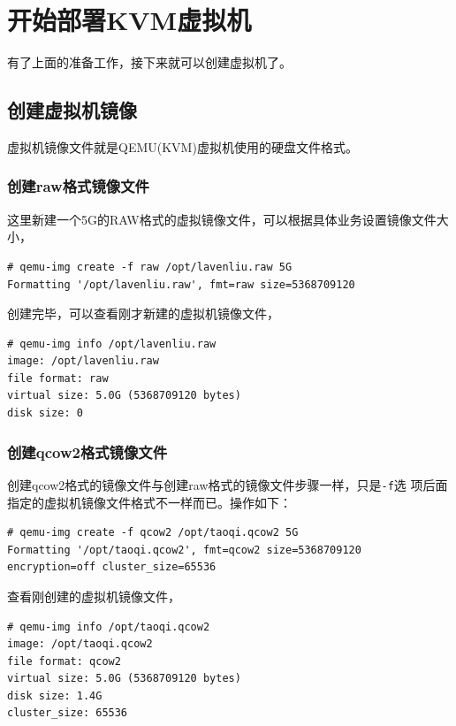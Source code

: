 \section{开始部署KVM虚拟机}
\label{sec:beginKVM}

有了上面的准备工作，接下来就可以创建虚拟机了。

\subsection{创建虚拟机镜像}
\label{sec:createVmImg}

虚拟机镜像文件就是QEMU(KVM)虚拟机使用的硬盘文件格式。

\subsubsection{创建raw格式镜像文件}
\label{sec:createRawImg}

这里新建一个5G的RAW格式的虚拟镜像文件，可以根据具体业务设置镜像文件大小，

\begin{verbatim}
# qemu-img create -f raw /opt/lavenliu.raw 5G
Formatting '/opt/lavenliu.raw', fmt=raw size=5368709120
\end{verbatim}

创建完毕，可以查看刚才新建的虚拟机镜像文件，

\begin{verbatim}
# qemu-img info /opt/lavenliu.raw 
image: /opt/lavenliu.raw
file format: raw
virtual size: 5.0G (5368709120 bytes)
disk size: 0
\end{verbatim}

\subsubsection{创建qcow2格式镜像文件}
\label{sec:createQcow2Img}

创建qcow2格式的镜像文件与创建raw格式的镜像文件步骤一样，只是\verb|-f|选
项后面指定的虚拟机镜像文件格式不一样而已。操作如下：

\begin{verbatim}
# qemu-img create -f qcow2 /opt/taoqi.qcow2 5G
Formatting '/opt/taoqi.qcow2', fmt=qcow2 size=5368709120 encryption=off cluster_size=65536
\end{verbatim}

查看刚创建的虚拟机镜像文件，

\begin{verbatim}
# qemu-img info /opt/taoqi.qcow2 
image: /opt/taoqi.qcow2
file format: qcow2
virtual size: 5.0G (5368709120 bytes)
disk size: 1.4G
cluster_size: 65536
\end{verbatim}

